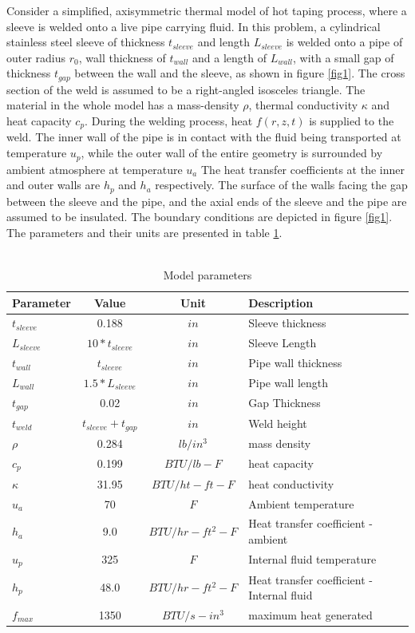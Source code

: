 \documentclass{article}
\begin{document}
 Consider a simplified, axisymmetric thermal model of hot taping process, where a sleeve is welded onto a live pipe carrying fluid. In this problem, a cylindrical stainless steel sleeve of thickness $t_{sleeve}$ and length $L_{sleeve}$ is welded onto a pipe of outer radius $r_0$, wall thickness of $t_{wall}$ and a length of $L_{wall}$, with a small gap of thickness $t_{gap}$ between the wall and the sleeve, as shown in figure \ref{fig1}. The cross section of the weld is assumed to be a right-angled isosceles triangle. The material in the whole model has a mass-density $\rho$, thermal conductivity $\kappa$ and heat capacity $c_p$. During the welding process, heat $f(r,z,t)$ is supplied to the weld. The inner wall of the pipe is in contact with the fluid being transported at temperature $u_p$, while the outer wall of the entire geometry is surrounded by ambient atmosphere at temperature $u_a$ The heat transfer coefficients at the inner and outer walls are $h_p$ and $h_a$ respectively. The surface of the walls facing the gap between the sleeve and the pipe, and the axial ends of the sleeve and the pipe are assumed to be insulated. The boundary conditions are depicted in figure \ref{fig1}. The parameters and their units are presented in table \ref{table:1}. \\ \\
 
\newpage
\begin{table}[h!]
\centering
\begin{tabular}{l|c|c|l}
Parameter & Value & Unit & Description \\
\hline
$t_{sleeve}$ & 0.188 & $in$ & Sleeve thickness \\
$L_{sleeve}$ & $10*t_{sleeve}$ & $in$ & Sleeve Length \\
$t_{wall}$ & $t_{sleeve}$ & $in$ & Pipe wall thickness \\
$L_{wall}$ & $1.5*L_{sleeve}$ & $in$ & Pipe wall length \\
$t_{gap}$ & 0.02 & $in$ & Gap Thickness \\
$t_{weld}$ & $t_{sleeve} + t_{gap}$ & $in$ & Weld height \\
$\rho$ & 0.284 & $lb/in^3$ & mass density \\
$c_p$ & 0.199 & $BTU/lb-F$ & heat capacity \\
$\kappa$ & 31.95 & $BTU/ht-ft-F$ & heat conductivity \\
$u_a$ & 70 & $F$ & Ambient temperature \\
$h_a$ & 9.0 & $BTU/hr-ft^2-F$ & Heat transfer coefficient - ambient \\
$u_p$ & 325 & $F$ & Internal fluid temperature \\
$h_p$ & 48.0 & $BTU/hr-ft^2-F$ & Heat transfer coefficient - Internal fluid \\
$f_{max}$ & 1350 & $BTU/s-in^3$ & maximum heat generated 
\end{tabular}
\caption{Model parameters}
\label{table:1}
\end{table}
\end{document}

